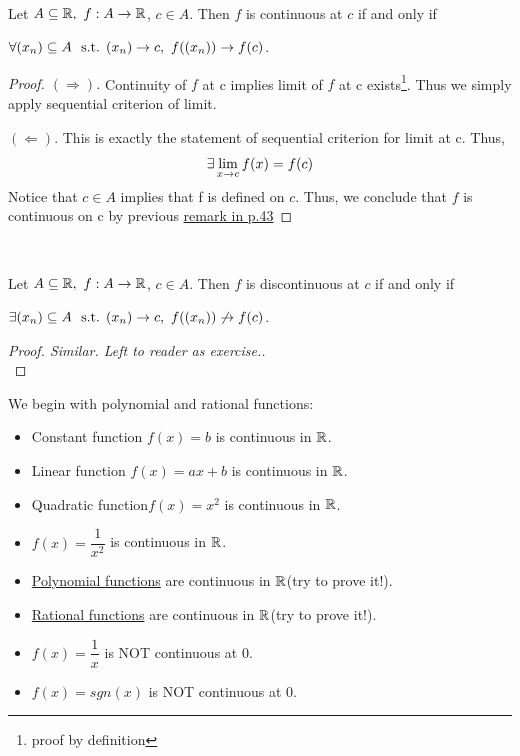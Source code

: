 \documentclass[a4paper,12pt]{article}
\begin{document}
\begin{theorem}\ 

    Let \(A\subseteq\R,\ f:A\rightarrow\R\), \(c \in A\). Then \(f\) is continuous at \(c\) if and only if 
    
    \(\forall (x _{n })\subseteq A\ \text{ s.t. }(x _{n })\rightarrow c,\ f((x _{n }))\rightarrow f(c)\).
    \begin{proof}[Proof. \((\Rightarrow)\)]
        Continuity of \(f\) at c implies limit of \(f\) at c exists\footnote{proof by definition}. Thus we simply apply sequential criterion of limit.

        \((\Leftarrow)\). This is exactly the statement of sequential criterion for limit at c. Thus, 
        \[\exists\lim_{x\rightarrow c } {f(x)}=f(c)\]
        Notice that \(c\in A\) implies that f is defined on \(c\). Thus, we conclude that \(f\) is continuous on c by previous \hyperlink{conti-criterion}{remark in p.43}
    \end{proof}
\end{theorem}

\begin{corollary}\ 

    Let \(A\subseteq\R,\ f:A\rightarrow\R\), \(c \in A\). Then \(f\) is discontinuous at \(c\) if and only if 
    
    \(\exists (x _{n })\subseteq A\ \text{ s.t. }(x _{n })\rightarrow c,\ f((x _{n }))\not\rightarrow f(c)\).
    \begin{proof}[Proof. Similar. Left to reader as exercise.]
        \ \\
    \end{proof}
\end{corollary}

\begin{example} We begin with polynomial and rational functions:
    \begin{itemize}
        \item Constant function \(f(x)=b\) is continuous in \(\mathbb{R}\).
        \item Linear function \(f(x)=ax+b\) is continuous in \(\mathbb{R}\).
        \item Quadratic function\(f(x)=x^2\) is continuous in \(\mathbb{R}\).
        \item \(f(x)=\dfrac{1}{x^2}\) is continuous in \(\mathbb{R}\).
        \item \hyperlink{polynomial-functions}{Polynomial functions} are continuous in \(\mathbb{R}\)(try to prove it!).
        \item \hyperlink{rational-functions}{Rational functions} are continuous in \(\mathbb{R}\)(try to prove it!).
        \item \(f(x)=\dfrac{1}{x}\) is NOT continuous at 0.
        \item \(f(x)=sgn(x)\) is NOT continuous at 0.\\
    \end{itemize}
\end{example}
\end{document}
